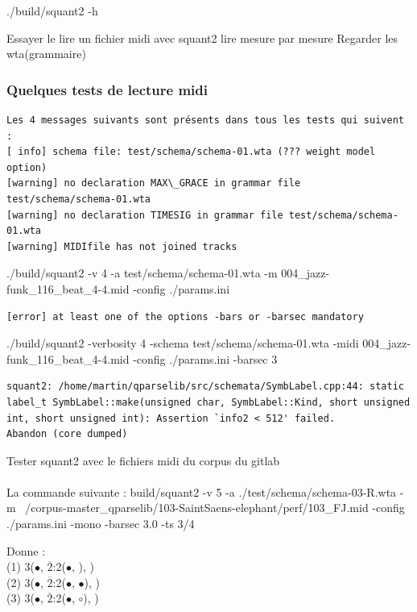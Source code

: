 ./build/squant2 -h

Essayer le lire un fichier midi avec squant2
lire mesure par mesure
Regarder les wta(grammaire)

\subsubsection{Quelques tests de lecture midi}
\begin{verbatim}
Les 4 messages suivants sont présents dans tous les tests qui suivent :
[ info] schema file: test/schema/schema-01.wta (??? weight model option)
[warning] no declaration MAX\_GRACE in grammar file test/schema/schema-01.wta
[warning] no declaration TIMESIG in grammar file test/schema/schema-01.wta
[warning] MIDIfile has not joined tracks
\end{verbatim}
./build/squant2 -v 4 -a test/schema/schema-01.wta -m 004\_jazz-funk\_116\_beat\_4-4.mid -config ./params.ini
\begin{verbatim}
[error] at least one of the options -bars or -barsec mandatory
\end{verbatim}
./build/squant2 -verbosity 4 -schema test/schema/schema-01.wta -midi 004\_jazz-funk\_116\_beat\_4-4.mid -config ./params.ini -barsec 3
\begin{verbatim}
squant2: /home/martin/qparselib/src/schemata/SymbLabel.cpp:44: static label_t SymbLabel::make(unsigned char, SymbLabel::Kind, short unsigned int, short unsigned int): Assertion `info2 < 512' failed.
Abandon (core dumped)
\end{verbatim}
Tester squant2 avec le fichiers midi du corpus du gitlab\\\\
La commande suivante :
build/squant2 -v 5 -a ./test/schema/schema-03-R.wta -m ~/corpus-master\_qparselib/103-SaintSaens-elephant/perf/103\_FJ.mid -config ./params.ini -mono -barsec 3.0 -ts 3/4	

Donne :\\
(1) 3($\bullet$, $\overline{2}$:2($\bullet$, ), )\\
(2) 3($\bullet$, $\overline{2}$:2($\bullet$, $\bullet$), )\\
(3) 3($\bullet$, $\overline{2}$:2($\bullet$, $\circ$), )\\\\


